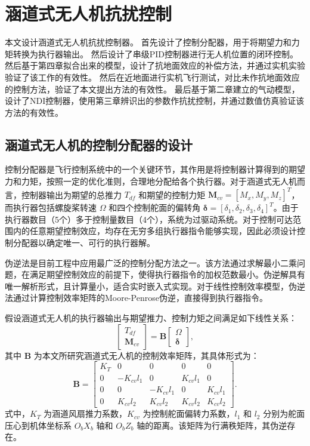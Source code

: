 \chapter{涵道式无人机抗扰控制}
本文设计涵道式无人机抗扰控制器。
首先设计了控制分配器，用于将期望力和力矩转换为执行器输出。
然后设计了串级PID控制器进行无人机位置的闭环控制。
然后基于第四章拟合出来的模型，设计了抗地面效应的补偿方法，并通过实机实验验证了该工作的有效性。
然后在近地面进行实机飞行测试，对比未作抗地面效应的控制方法，验证了本文提出方法的有效性。
最后基于第二章建立的气动模型，设计了NDI控制器，使用第三章辨识出的参数作抗扰控制，并通过数值仿真验证该方法的有效性。

\section{涵道式无人机的控制分配器的设计}

控制分配器是飞行控制系统中的一个关键环节，其作用是将控制器计算得到的期望力和力矩，按照一定的优化准则，合理地分配给各个执行器。对于涵道式无人机而言，控制器输出为期望的总推力 \(T_{df}\) 和期望的控制力矩 \(\bm{M}_{cv} = [M_x, M_y, M_z]^T\)，而执行器包括螺旋桨转速 \(\Omega\) 和四个控制舵面的偏转角 \(\bm{\delta} = [\delta_1, \delta_2, \delta_3, \delta_4]^T\)。由于执行器数目（5个）多于控制量数目（4个），系统为过驱动系统。对于控制可达范围内的任意期望控制效应，均存在无穷多组执行器指令能够实现，因此必须设计控制分配器以确定唯一、可行的执行器解。

伪逆法是目前工程中应用最广泛的控制分配方法之一。该方法通过求解最小二乘问题，在满足期望控制效应的前提下，使得执行器指令的加权范数最小。伪逆解具有唯一解析形式，且计算量小，适合实时嵌入式实现。对于线性控制效率模型，伪逆法通过计算控制效率矩阵的Moore-Penrose伪逆，直接得到执行器指令。

假设涵道式无人机的执行器输出与期望推力、控制力矩之间满足如下线性关系：
\begin{equation}
    \begin{bmatrix}
        T_{df} \\
        \bm{M}_{cv}
    \end{bmatrix} = \bm{B}
    \begin{bmatrix}
        \Omega \\
        \bm{\delta}
    \end{bmatrix},
\end{equation}
其中 \(\bm{B}\) 为本文所研究涵道式无人机的控制效率矩阵，其具体形式为：
\begin{equation}
    \bm{B} = 
    \begin{bmatrix}
        K_T & 0 & 0 & 0 & 0 \\
        0 & -K_{cv} l_1 & 0 & K_{cv} l_1 & 0 \\
        0 & 0 & -K_{cv} l_1 & 0 & K_{cv} l_1 \\
        0 & K_{cv} l_2 & K_{cv} l_2 & K_{cv} l_2 & K_{cv} l_2
    \end{bmatrix}.
\end{equation}
式中，\(K_T\) 为涵道风扇推力系数，\(K_{cv}\) 为控制舵面偏转力系数，\(l_1\) 和 \(l_2\) 分别为舵面压心到机体坐标系 \(O_bX_b\) 轴和 \(O_bZ_b\) 轴的距离。该矩阵为行满秩矩阵，其伪逆存在。

